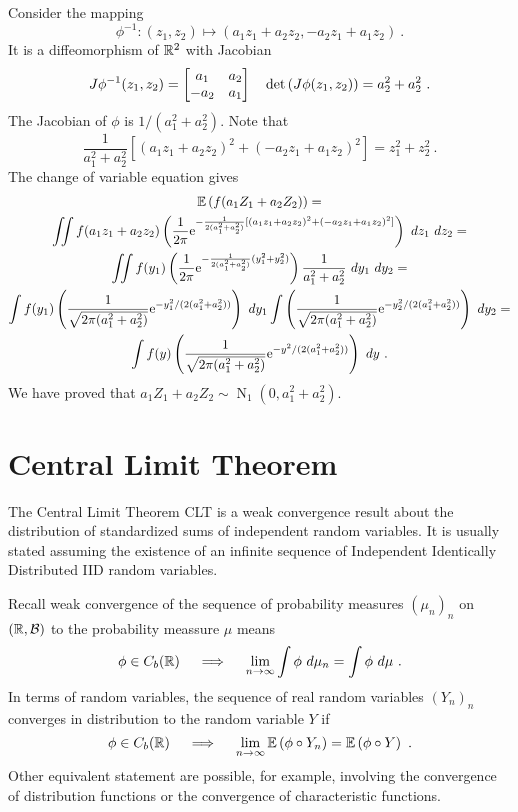 \documentclass[12pt,a4paper]{amsart}
\newcommand{\gaussian}[3]{\operatorname{N}_{#1}\left(#2,#3\right)}
\theoremstyle{plain}%
\theoremstyle{definition}
\theoremstyle{remark}
\begin{document}
  Consider the mapping
  \begin{equation*}
    \phi^{-1} \colon (z_1,z_2) \mapsto (a_1z_1+a_2z_2,-a_2z_1+a_1z_2) \ .
  \end{equation*}
  It is a diffeomorphism of $\mathbb{R}^2$ with Jacobian
  \begin{equation*}
    J\phi^{-1}(z_1,z_2) =
    \begin{bmatrix}
      a_1 & a_2 \\ -a_2 & a_1
    \end{bmatrix} \quad \detof {J\phi(z_1,z_2)} = a_2^2 + a_2^2 \ .
  \end{equation*}
The Jacobian of $\phi$ is $1/(a_1^2+a_2^2)$. Note that
  \begin{equation*}
   \frac1{a_1^2+a_2^2} [(a_1z_1+a_2z_2)^2 + (-a_2z_1+a_1z_2)^2] = z_1^2+z_2^2 \ .
 \end{equation*}
 The change of variable equation gives
 \begin{multline*}\operatorname{\mathbb E}\left(f(a_1Z_1+a_2Z_2)\right) = \\ \iint f(a_1z_1 + a_2z_2) \left(\frac1{2\pi} \mathrm{e}^{-\frac1{2(a_1^2+a_2^2)} [(a_1z_1+a_2z_2)^2 + (-a_2z_1+a_1z_2)^2]}\right) \ dz_1\ dz_2 = \\
   \iint f(y_1) \left(\frac1{2\pi} \mathrm{e}^{-\frac1{2(a_1^2+a_2^2)} (y_1^2 + y_2^2)}\right) \frac1{a_1^2+a_2^2} \ dy_1 \ dy_2 = \\
   \int f(y_1) \left(\frac1{\sqrt{2\pi(a_1^2+a_2^2)}} \mathrm{e}^{-y_1^2/(2(a_1^2+a_2^2))}\right) \ dy_1
   \int \left(\frac1{\sqrt{2\pi(a_1^2+a_2^2)}} \mathrm{e}^{-y_2^2/(2(a_1^2+a_2^2))}\right) \ d y_2 = \\
   \int f(y) \left(\frac1{\sqrt{2\pi(a_1^2+a_2^2)}} \mathrm{e}^{-y^2/(2(a_1^2+a_2^2))}\right) \ dy \ .
 \end{multline*}
We have proved that $a_1Z_1+a_2Z_2 \sim \gaussian 1 0 {a_1^2+a_2^2}$.
 \section{Central Limit Theorem}
\label{sec:centr-limit-theor}

The Central Limit Theorem CLT is a weak convergence result about the
distribution of standardized sums of independent random variables. It
is usually stated assuming the existence of an infinite sequence of
Independent Identically Distributed IID random variables.

Recall weak convergence of the sequence of probability measures $(\mu_n)_n$ on $(\mathbb{R},\mathcal B)$ to the probability meassure $\mu$ means
\begin{equation*}
  \phi \in C_b(\reals) \quad \implies \quad \lim_{n \to \infty} \int \phi \ d\mu_n = \int \phi \ d\mu \ .
\end{equation*}
In terms of random variables, the sequence of real random variables $(Y_n)_n$ converges in distribution to the random variable $Y$ if
\begin{equation*}
  \phi \in C_b(\mathbb{R}) \quad \implies \quad \lim_{n \to \infty} \operatorname{\mathbb E}\left(\phi\circ Y_n\right) = \operatorname{\mathbb E}\left(\phi\circ Y\right) \ .
\end{equation*}
Other equivalent statement are possible, for example, involving the convergence of distribution functions or the convergence of characteristic functions. 
\end{document}
